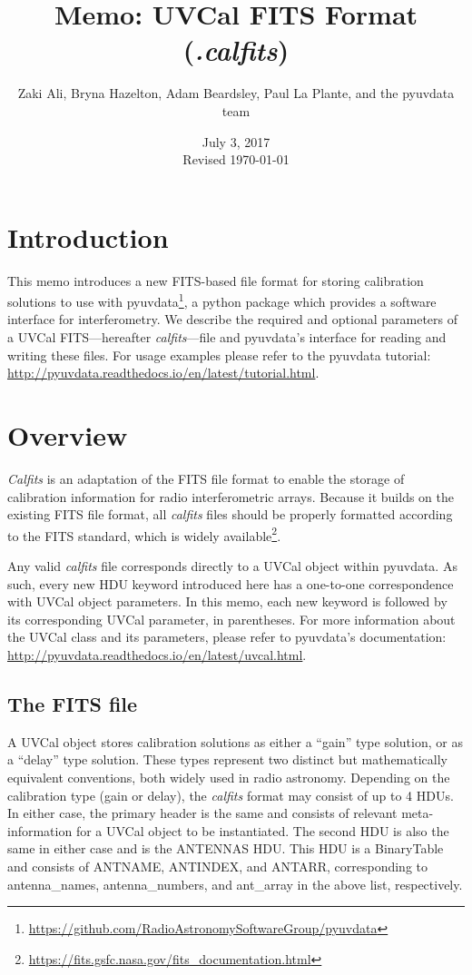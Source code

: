 \documentclass[11pt, oneside, english]{article}   	%
\title{Memo: UVCal FITS Format (\emph{.calfits})}
\author{Zaki Ali, Bryna Hazelton, Adam Beardsley, Paul La Plante, and the pyuvdata team}
\date{July 3, 2017\\
 Revised \today}
\begin{document}
\maketitle
\section{Introduction}
This memo introduces a new FITS-based file format for storing calibration solutions to use with pyuvdata\footnote{\url{https://github.com/RadioAstronomySoftwareGroup/pyuvdata}}, a python package which
provides a software interface for interferometry.
We describe the required and optional parameters of a UVCal FITS---hereafter \textit{calfits}---file and pyuvdata's interface for reading and writing these files. 
For usage examples please refer to the pyuvdata tutorial: \url{http://pyuvdata.readthedocs.io/en/latest/tutorial.html}.

\section{Overview}
\textit{Calfits} is an adaptation of the FITS file format to enable the storage of calibration information for radio interferometric arrays. %
Because it builds on the existing FITS file format, all \emph{calfits} files should be properly formatted according to the FITS standard, which is widely available\footnote{\url{https://fits.gsfc.nasa.gov/fits_documentation.html}}.


Any valid \textit{calfits} file corresponds directly to a UVCal object within pyuvdata.
As such, every new HDU keyword introduced here has a one-to-one correspondence with UVCal object parameters.
In this memo, each new keyword is followed by its corresponding UVCal parameter, in parentheses. 
For more information about the UVCal class and its parameters, please refer to pyuvdata's documentation: \url{http://pyuvdata.readthedocs.io/en/latest/uvcal.html}.

\subsection{The FITS file}

A UVCal object stores calibration solutions as either a ``gain'' type solution, or as a ``delay'' type solution.
These types represent two distinct but mathematically equivalent conventions, both widely used in radio astronomy.
Depending on the calibration type (gain or delay), the \textit{calfits} format may consist of up to 4 HDUs. 
In either case, the primary header is the same and consists of relevant meta-information for a UVCal object to be instantiated.
The second HDU is also the same in either case and is the ANTENNAS HDU. 
This HDU is a BinaryTable and consists of ANTNAME, ANTINDEX, and ANTARR, corresponding to antenna\_names, antenna\_numbers, and ant\_array in the above list, respectively. %
\end{document}
